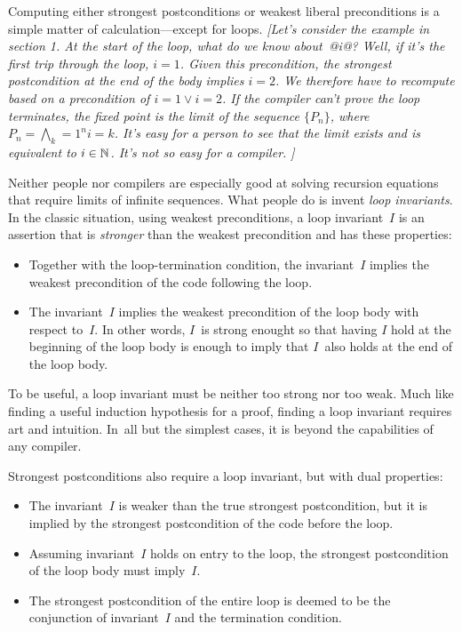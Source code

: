 Computing either strongest postconditions or weakest liberal
preconditions is a simple matter of calculation---except for loops.
\emph{[Let's consider the example in section 1.  At the start of the
    loop, what do we know about~@i@?
Well, if it's the first trip through the loop, $i=1$.
Given this precondition, the strongest postcondition at the end of the
body implies $i=2$.
We therefore have to recompute based on a precondition of $i=1 \lor
i=2$.
If the compiler can't prove the loop terminates, the fixed point is
the limit of the sequence $\{P_n\}$, where $P_n = \bigwedge_k=1^n i =
k$.
It's easy for a person to see that the limit exists and is equivalent
to $i \in \mathbb{N}$.
It's not so easy for a compiler.
]}

Neither people nor compilers are especially good at solving recursion
equations that require limits of infinite sequences.
What people do is invent \emph{loop invariants}.
In the classic situation, using weakest preconditions, a loop
invariant~$I$ is an assertion that is \emph{stronger} than the weakest
precondition and has these properties:
\begin{itemize}
\item
Together with the loop-termination condition, the invariant~$I$ implies the weakest
precondition of the code following the loop.
\item
The invariant~$I$ implies the weakest precondition of the loop body
with respect to~$I$.
In other words, $I$~is strong enought so that having $I$ hold at the
beginning of the loop body is enough to
imply that $I$~also holds at the end of the loop body.
\end{itemize}
To be useful, a loop invariant must be neither too strong nor too
weak.
Much like finding a useful induction hypothesis for a proof, 
finding a loop invariant requires art and intuition.
In~all but the simplest cases, it is beyond the capabilities of any
compiler.

Strongest postconditions also require a loop invariant, but with dual
properties:
\begin{itemize}
\item
The invariant~$I$ is weaker than the true strongest postcondition,
but it is implied by the strongest postcondition of the code before
the loop.
\item
Assuming invariant~$I$ holds on entry to the loop, the strongest
postcondition of the loop body must imply~$I$.
\item
The strongest postcondition of the entire loop is deemed to be the
conjunction of invariant~$I$ and the termination condition.
\end{itemize}


